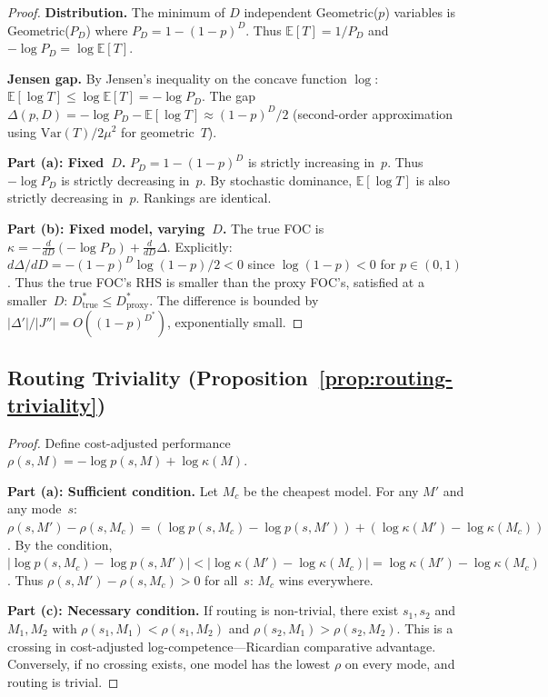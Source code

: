 \documentclass[twoside,11pt]{article}
\newcommand{\E}{\mathbb{E}}
\newcommand{\Var}{\mathrm{Var}}
\newcommand{\Dstar}{D^*}
\begin{document}
\begin{proof}
\noindent\textbf{Distribution.}
The minimum of $D$ independent Geometric($p$) variables is Geometric($P_D$) where $P_D = 1-(1-p)^D$.
Thus $\E[T] = 1/P_D$ and $-\log P_D = \log \E[T]$.

\noindent\textbf{Jensen gap.}
By Jensen's inequality on the concave function $\log$:
$\E[\log T] \le \log \E[T] = -\log P_D$.
The gap $\Delta(p,D) = -\log P_D - \E[\log T] \approx (1-p)^D/2$ (second-order approximation using $\Var(T)/2\mu^2$ for geometric~$T$).

\noindent\textbf{Part (a): Fixed~$D$.}
$P_D = 1-(1-p)^D$ is strictly increasing in~$p$.
Thus $-\log P_D$ is strictly decreasing in~$p$.
By stochastic dominance, $\E[\log T]$ is also strictly decreasing in~$p$.
Rankings are identical.

\noindent\textbf{Part (b): Fixed model, varying~$D$.}
The true FOC is $\kappa = -\frac{d}{dD}(-\log P_D) + \frac{d}{dD}\Delta$.
Explicitly: $d\Delta/dD = -(1-p)^D \log(1-p)/2 < 0$ since $\log(1-p) < 0$ for $p \in (0,1)$.
Thus the true FOC's RHS is smaller than the proxy FOC's, satisfied at a smaller~$D$:
$\Dstar_{\mathrm{true}} \le \Dstar_{\mathrm{proxy}}$.
The difference is bounded by $|\Delta'|/|J''| = O((1-p)^{\Dstar})$, exponentially small.
\end{proof}

\subsection{Routing Triviality (Proposition~\ref{prop:routing-triviality})}
\label{app:routing}

\begin{proof}
Define cost-adjusted performance $\rho(s,M) = -\log p(s,M) + \log\kappa(M)$.

\noindent\textbf{Part (a): Sufficient condition.}
Let $M_c$ be the cheapest model.
For any $M'$ and any mode~$s$:
$\rho(s,M') - \rho(s,M_c) = (\log p(s,M_c) - \log p(s,M')) + (\log\kappa(M') - \log\kappa(M_c))$.
By the condition, $|\log p(s,M_c) - \log p(s,M')| < |\log\kappa(M') - \log\kappa(M_c)| = \log\kappa(M') - \log\kappa(M_c)$.
Thus $\rho(s,M') - \rho(s,M_c) > 0$ for all~$s$: $M_c$ wins everywhere.

\noindent\textbf{Part (c): Necessary condition.}
If routing is non-trivial, there exist $s_1, s_2$ and $M_1, M_2$ with $\rho(s_1,M_1) < \rho(s_1,M_2)$ and $\rho(s_2,M_1) > \rho(s_2,M_2)$.
This is a crossing in cost-adjusted log-competence---Ricardian comparative advantage.
Conversely, if no crossing exists, one model has the lowest $\rho$ on every mode, and routing is trivial.
\end{proof}
\end{document}
